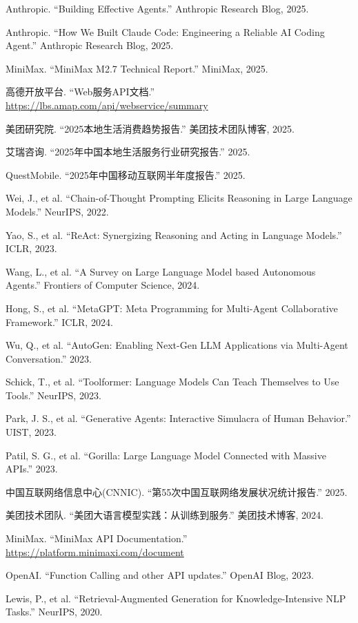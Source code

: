 \documentclass[12pt,a4paper]{ctexart}
\begin{document}
\begin{enumerate}[leftmargin=2em, label={[\arabic*]}]
  \item Anthropic. ``Building Effective Agents.'' Anthropic Research Blog, 2025.
  \item Anthropic. ``How We Built Claude Code: Engineering a Reliable AI Coding Agent.'' Anthropic Research Blog, 2025.
  \item MiniMax. ``MiniMax M2.7 Technical Report.'' MiniMax, 2025.
  \item 高德开放平台. ``Web服务API文档.'' \url{https://lbs.amap.com/api/webservice/summary}
  \item 美团研究院. ``2025本地生活消费趋势报告.'' 美团技术团队博客, 2025.
  \item 艾瑞咨询. ``2025年中国本地生活服务行业研究报告.'' 2025.
  \item QuestMobile. ``2025年中国移动互联网半年度报告.'' 2025.
  \item Wei, J., et al. ``Chain-of-Thought Prompting Elicits Reasoning in Large Language Models.'' NeurIPS, 2022.
  \item Yao, S., et al. ``ReAct: Synergizing Reasoning and Acting in Language Models.'' ICLR, 2023.
  \item Wang, L., et al. ``A Survey on Large Language Model based Autonomous Agents.'' Frontiers of Computer Science, 2024.
  \item Hong, S., et al. ``MetaGPT: Meta Programming for Multi-Agent Collaborative Framework.'' ICLR, 2024.
  \item Wu, Q., et al. ``AutoGen: Enabling Next-Gen LLM Applications via Multi-Agent Conversation.'' 2023.
  \item Schick, T., et al. ``Toolformer: Language Models Can Teach Themselves to Use Tools.'' NeurIPS, 2023.
  \item Park, J. S., et al. ``Generative Agents: Interactive Simulacra of Human Behavior.'' UIST, 2023.
  \item Patil, S. G., et al. ``Gorilla: Large Language Model Connected with Massive APIs.'' 2023.
  \item 中国互联网络信息中心(CNNIC). ``第55次中国互联网络发展状况统计报告.'' 2025.
  \item 美团技术团队. ``美团大语言模型实践：从训练到服务.'' 美团技术博客, 2024.
  \item MiniMax. ``MiniMax API Documentation.'' \url{https://platform.minimaxi.com/document}
  \item OpenAI. ``Function Calling and other API updates.'' OpenAI Blog, 2023.
  \item Lewis, P., et al. ``Retrieval-Augmented Generation for Knowledge-Intensive NLP Tasks.'' NeurIPS, 2020.
\end{enumerate}
\end{document}

